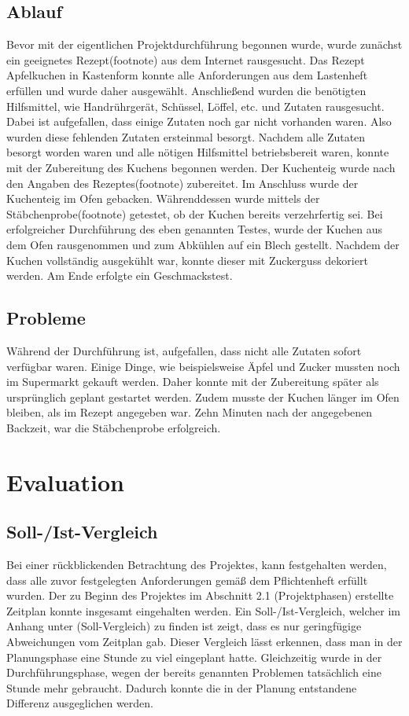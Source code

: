 \subsection{Ablauf}
Bevor mit der eigentlichen Projektdurchführung begonnen wurde, wurde zunächst ein geeignetes Rezept(footnote) aus dem Internet rausgesucht. Das Rezept Apfelkuchen in Kastenform konnte alle Anforderungen aus dem Lastenheft erfüllen und wurde daher ausgewählt.
Anschließend wurden die benötigten Hilfsmittel, wie Handrührgerät, Schüssel, Löffel, etc. und Zutaten rausgesucht. Dabei ist aufgefallen, dass einige Zutaten
noch gar nicht vorhanden waren. Also wurden diese fehlenden Zutaten ersteinmal besorgt. Nachdem alle Zutaten besorgt worden waren und alle nötigen Hilfsmittel betriebsbereit waren, konnte mit der
Zubereitung des Kuchens begonnen werden. Der Kuchenteig wurde nach den Angaben des Rezeptes(footnote) zubereitet. Im Anschluss wurde der Kuchenteig im Ofen gebacken.
Währenddessen wurde mittels der Stäbchenprobe(footnote) getestet, ob der Kuchen bereits verzehrfertig sei. Bei erfolgreicher Durchführung des eben genannten Testes, wurde der Kuchen aus dem Ofen rausgenommen und zum Abkühlen auf ein Blech gestellt.
Nachdem der Kuchen vollständig ausgekühlt war, konnte dieser mit Zuckerguss dekoriert werden. Am Ende erfolgte ein Geschmackstest.
\subsection{Probleme}
Während der Durchführung ist, aufgefallen, dass nicht alle Zutaten sofort verfügbar waren. Einige Dinge, wie beispielsweise Äpfel und Zucker mussten noch im Supermarkt gekauft werden. Daher konnte mit der Zubereitung später als ursprünglich geplant gestartet werden.
Zudem musste der Kuchen länger im Ofen bleiben, als im Rezept angegeben war. Zehn Minuten nach der angegebenen Backzeit, war die Stäbchenprobe erfolgreich.
\section{Evaluation}
\subsection{Soll-/Ist-Vergleich}
Bei einer rückblickenden Betrachtung des Projektes, kann festgehalten werden, dass alle zuvor festgelegten Anforderungen gemäß dem Pflichtenheft erfüllt wurden. Der zu Beginn des Projektes im Abschnitt 2.1 (Projektphasen) erstellte Zeitplan konnte insgesamt eingehalten werden.
Ein Soll-/Ist-Vergleich, welcher im Anhang unter (Soll-Vergleich) zu finden ist zeigt, dass es nur geringfügige Abweichungen vom Zeitplan gab. Dieser Vergleich lässt erkennen, dass man in der Planungsphase eine Stunde zu viel eingeplant hatte. Gleichzeitig wurde in der Durchführungsphase, wegen der bereits genannten Problemen tatsächlich eine Stunde mehr gebraucht.
Dadurch konnte die in der Planung entstandene Differenz ausgeglichen werden.
